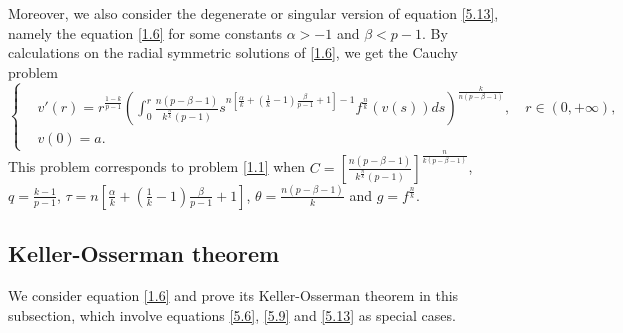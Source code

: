 \documentclass[a4paper,11pt]{amsart}
\theoremstyle{plain}
\theoremstyle{remark}
\numberwithin{equation}{section}
\numberwithin{figure}{section}
\numberwithin{remark}{section}
\begin{document}
\begin{sloppypar}
	Moreover, we also consider the degenerate or singular version of equation \eqref{5.13}, namely the equation \eqref{1.6} for some constants $\alpha>-1$ and $\beta<p-1$.
	By calculations on the radial symmetric solutions of \eqref{1.6}, we get the Cauchy problem
	\begin{equation}\label{5.17}
	\left\{
	\begin{aligned}
	&v'(r)=r^{\frac{1-k}{p-1}} \left ( \int_{0}^{r} \frac{n(p-\beta-1)}{k^{\frac{n}{k}}(p-1)} s^{n\left[\frac{\alpha}{k}+(\frac{1}{k}-1)\frac{\beta}{p-1} +1\right]-1} f^{\frac{n}{k}} (v(s))ds\right)^{\frac{k}{n(p-\beta-1)}}, \quad r\in (0, +\infty), \\
	&v(0)=a.
	\end{aligned}
	\right.
	\end{equation}
	This problem corresponds to problem \eqref{1.1} when $C=\left [\frac{n(p-\beta-1)}{k^{\frac{n}{k}}(p-1)} \right ]^{\frac{n}{k(p-\beta-1)}}$, $q=\frac{k-1}{p-1}$, $\tau =n\left[\frac{\alpha}{k}+(\frac{1}{k}-1)\frac{\beta}{p-1} +1\right]$, $\theta=\frac{n(p-\beta-1)}{k}$ and $g=f^{\frac{n}{k}}$.


\subsection{Keller-Osserman theorem}\label{Section 5.3}

We consider equation \eqref{1.6} and prove its Keller-Osserman theorem in this subsection, which involve equations \eqref{5.6}, \eqref{5.9} and \eqref{5.13} as special cases. 


\end{sloppypar}
\end{document}
